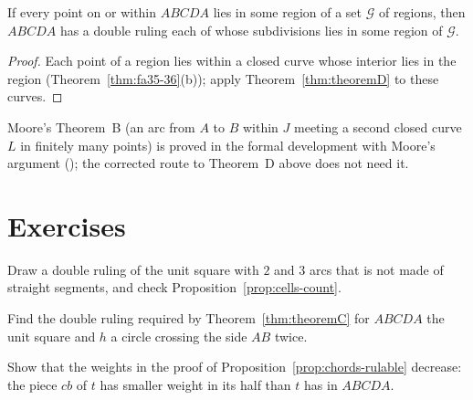 
\begin{corollary}\label{cor:theoremD-regions}
If every point on or within $ABCDA$ lies in some region of a set $\mathcal G$ of regions, then $ABCDA$ has a double ruling each of whose
subdivisions lies in some region of $\mathcal G$.
\end{corollary}

\begin{proof}
Each point of a region lies within a closed curve whose interior lies in the region (Theorem~\ref{thm:fa35-36}(b)); apply
Theorem~\ref{thm:theoremD} to these curves.
\end{proof}


\begin{remark}
Moore's Theorem~B (an arc from $A$ to $B$ within $J$ meeting a second closed curve $L$ in finitely many points) is proved in the formal
development with Moore's argument (); the corrected route to Theorem~D above does not need it.
\end{remark}

\section*{Exercises}

\begin{exercise}
Draw a double ruling of the unit square with $2$ and $3$ arcs that is not made of straight segments, and check
Proposition~\ref{prop:cells-count}.
\end{exercise}

\begin{exercise}
Find the double ruling required by Theorem~\ref{thm:theoremC} for $ABCDA$ the unit square and $h$ a circle crossing the side $AB$ twice.
\end{exercise}

\begin{exercise}
Show that the weights in the proof of Proposition~\ref{prop:chords-rulable} decrease: the piece $cb$ of $t$ has smaller weight in its half
than $t$ has in $ABCDA$.
\end{exercise}
